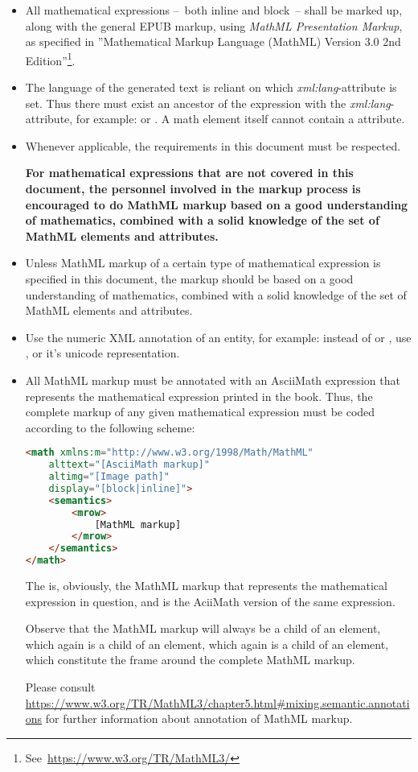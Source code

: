 \documentclass[english,a4paper,11pt]{article}
\begin{document}
\begin{itemize}
	\item All mathematical expressions --~both inline and block~-- shall be marked up, along with the general EPUB markup, using \emph{MathML Presentation Markup}, as specified in ''Mathematical Markup Language (MathML) Version 3.0 2nd Edition''\footnote{See~\url{https://www.w3.org/TR/MathML3/}}.
	\item The language of the generated text is reliant on which \emph{xml:lang}-attribute is set. Thus there must exist an ancestor of the expression with the \emph{xml:lang}-attribute, for example:  or . A math element itself cannot contain a  attribute.
	\item Whenever applicable, the requirements in this document must be respected.
	
	\textbf{For mathematical expressions that are not covered in this document, the personnel involved in the markup process is encouraged to do MathML markup based on a good understanding of mathematics, combined with a solid knowledge of the set of MathML elements and attributes.}

	\item Unless MathML markup of a certain type of mathematical expression is specified in this document, the markup should be based on a good understanding of mathematics, combined with a solid knowledge of the set of MathML elements and attributes.
	\item Use the numeric XML annotation of an entity, for example: instead of  or , use , or it's unicode representation.
	\item All MathML markup must be annotated with an AsciiMath expression that represents the mathematical expression printed in the book. Thus, the complete markup of any given mathematical expression must be coded according to the following scheme:

\begin{lstlisting}[language=HTML, caption={Default MathML markup}]
<math xmlns:m="http://www.w3.org/1998/Math/MathML"
	alttext="[AsciiMath markup]" 
	altimg="[Image path]" 
	display="[block|inline]">
	<semantics>
		<mrow>
			[MathML markup]
		</mrow>
	</semantics>
</math>
\end{lstlisting}

	The  is, obviously, the MathML markup that represents the mathematical expression in question, and  is the AciiMath version of the same expression.

Observe that the MathML markup will always be a child of an  element, which again is a child of an  element, which again is a child of an  element, which constitute the frame around the complete MathML markup.

\bigskip
Please consult \url{https://www.w3.org/TR/MathML3/chapter5.html#mixing.semantic.annotations} for further information about annotation of MathML markup.
\end{itemize}
\end{document}
